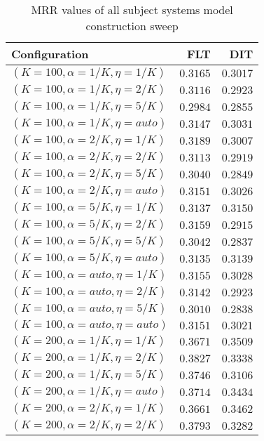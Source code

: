 
\begin{table}
\begin{spacing}{1.2}
\centering
\caption{MRR values of all subject systems model construction sweep}
\label{table:all_model_sweep}
\vspace{0.2em}
\parbox{.45\linewidth}{\centering \begin{tabular}{lrr}
\toprule
                   Configuration &      FLT &      DIT \\
\midrule
   $(K=100,\alpha=1/K,\eta=1/K)$ & $0.3165$ & $0.3017$ \\
   $(K=100,\alpha=1/K,\eta=2/K)$ & $0.3116$ & $0.2923$ \\
   $(K=100,\alpha=1/K,\eta=5/K)$ & $0.2984$ & $0.2855$ \\
  $(K=100,\alpha=1/K,\eta=auto)$ & $0.3147$ & $0.3031$ \\
   $(K=100,\alpha=2/K,\eta=1/K)$ & $0.3189$ & $0.3007$ \\
   $(K=100,\alpha=2/K,\eta=2/K)$ & $0.3113$ & $0.2919$ \\
   $(K=100,\alpha=2/K,\eta=5/K)$ & $0.3040$ & $0.2849$ \\
  $(K=100,\alpha=2/K,\eta=auto)$ & $0.3151$ & $0.3026$ \\
   $(K=100,\alpha=5/K,\eta=1/K)$ & $0.3137$ & $0.3150$ \\
   $(K=100,\alpha=5/K,\eta=2/K)$ & $0.3159$ & $0.2915$ \\
   $(K=100,\alpha=5/K,\eta=5/K)$ & $0.3042$ & $0.2837$ \\
  $(K=100,\alpha=5/K,\eta=auto)$ & $0.3135$ & $0.3139$ \\
  $(K=100,\alpha=auto,\eta=1/K)$ & $0.3155$ & $0.3028$ \\
  $(K=100,\alpha=auto,\eta=2/K)$ & $0.3142$ & $0.2923$ \\
  $(K=100,\alpha=auto,\eta=5/K)$ & $0.3010$ & $0.2838$ \\
 $(K=100,\alpha=auto,\eta=auto)$ & $0.3151$ & $0.3021$ \\
   $(K=200,\alpha=1/K,\eta=1/K)$ & $0.3671$ & $0.3509$ \\
   $(K=200,\alpha=1/K,\eta=2/K)$ & $0.3827$ & $0.3338$ \\
   $(K=200,\alpha=1/K,\eta=5/K)$ & $0.3746$ & $0.3106$ \\
  $(K=200,\alpha=1/K,\eta=auto)$ & $0.3714$ & $0.3434$ \\
   $(K=200,\alpha=2/K,\eta=1/K)$ & $0.3661$ & $0.3462$ \\
   $(K=200,\alpha=2/K,\eta=2/K)$ & $0.3793$ & $0.3282$ \\

\end{tabular}}
\end{spacing}
\end{table}
